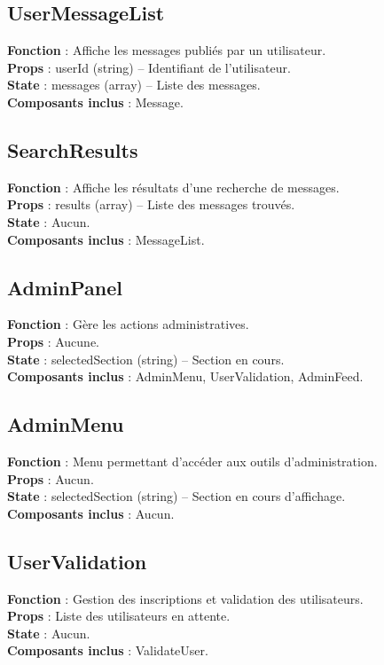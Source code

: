 \documentclass{article}
\begin{document}
\subsection*{UserMessageList}
\textbf{Fonction} : Affiche les messages publiés par un utilisateur.\\
\textbf{Props} : userId (string) – Identifiant de l’utilisateur.\\
\textbf{State} : messages (array) – Liste des messages.\\
\textbf{Composants inclus} : Message.

\subsection*{SearchResults}
\textbf{Fonction} : Affiche les résultats d’une recherche de messages.\\
\textbf{Props} : results (array) – Liste des messages trouvés.\\
\textbf{State} : Aucun.\\
\textbf{Composants inclus} : MessageList.

\subsection*{AdminPanel}
\textbf{Fonction} : Gère les actions administratives.\\
\textbf{Props} : Aucune.\\
\textbf{State} : selectedSection (string) – Section en cours.\\
\textbf{Composants inclus} : AdminMenu, UserValidation, AdminFeed.

\subsection*{AdminMenu}
\textbf{Fonction} : Menu permettant d’accéder aux outils d’administration.\\
\textbf{Props} : Aucun.\\
\textbf{State} : selectedSection (string) – Section en cours d’affichage.\\
\textbf{Composants inclus} : Aucun.

\subsection*{UserValidation}
\textbf{Fonction} : Gestion des inscriptions et validation des utilisateurs.\\
\textbf{Props} : Liste des utilisateurs en attente.\\
\textbf{State} : Aucun.\\
\textbf{Composants inclus} : ValidateUser.
\end{document}
